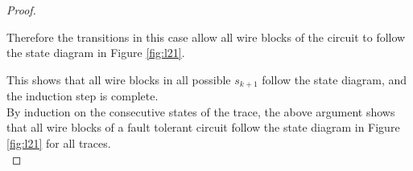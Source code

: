 \documentclass[12pt]{report}
\begin{document}
\begin{proof}
\begin{itemize}
\begin{itemize}
\end{itemize}
Therefore the transitions in this case allow all wire blocks of the circuit to follow the state diagram in Figure \ref{fig:l21}.\\


\end{itemize}
This shows that all wire blocks in all possible $s_{k+1}$ follow the state diagram, and the induction step is complete.\\
By induction on the consecutive states of the trace, the above argument shows that all wire blocks of a fault tolerant circuit follow the state diagram in Figure \ref{fig:l21} for all traces. \\
\end{proof}
\end{document}
